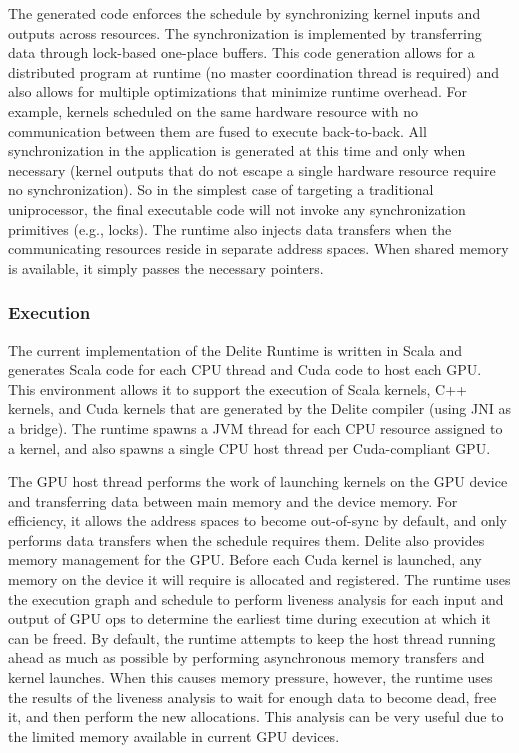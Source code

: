 The generated code enforces the schedule by synchronizing
kernel inputs and outputs across resources. The synchronization is implemented 
by transferring data through lock-based one-place buffers. This code generation allows for a distributed
program at runtime (no master coordination thread is required)
and also allows for multiple optimizations that minimize runtime overhead. For example, kernels scheduled on the same
hardware resource with no communication between them are
fused to execute back-to-back. All synchronization in the
application is generated at this time and only when necessary
(kernel outputs that do not escape a single hardware resource
require no synchronization). So in the simplest case of targeting a traditional uniprocessor, the final executable code will
not invoke any synchronization primitives (e.g., locks). The
runtime also injects data transfers when the communicating
resources reside in separate address spaces. When shared
memory is available, it simply passes the necessary pointers.


\subsubsection{Execution}

The current implementation of the Delite Runtime is written
in Scala and generates Scala code for each CPU thread and
Cuda code to host each GPU. This environment allows it to
support the execution of Scala kernels, C++ kernels, and Cuda
kernels that are generated by the Delite compiler (using JNI
as a bridge). The runtime spawns a JVM thread for each CPU
resource assigned to a kernel, and also spawns a single CPU
host thread per Cuda-compliant GPU.

The GPU host thread performs the work of launching
kernels on the GPU device and transferring data between
main memory and the device memory. For efficiency, it allows
the address spaces to become out-of-sync by default, and
only performs data transfers when the schedule requires them.
Delite also provides memory management for the GPU. Before
each Cuda kernel is launched, any memory on the device it
will require is allocated and registered. The runtime uses the
execution graph and schedule to perform liveness analysis for
each input and output of GPU ops to determine the earliest
time during execution at which it can be freed. By default,
the runtime attempts to keep the host thread running ahead
as much as possible by performing asynchronous memory
transfers and kernel launches. When this causes memory
pressure, however, the runtime uses the results of the liveness
analysis to wait for enough data to become dead, free it, and
then perform the new allocations. This analysis can be very
useful due to the limited memory available in current GPU
devices.